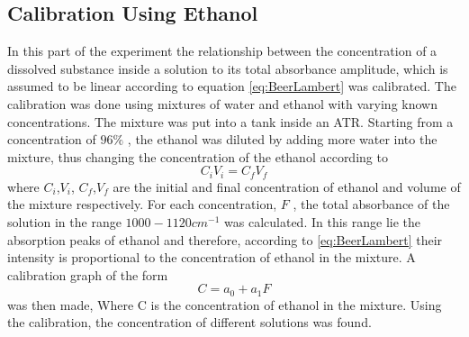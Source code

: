 \documentclass[reprint,amsmath,amssymb,aps, prl]{revtex4-2}
\begin{document}
\subsection{Calibration Using Ethanol} 
In this part of the experiment the relationship between the concentration of a dissolved substance inside a solution
to its total absorbance amplitude, which is assumed to be linear according to equation \ref{eq:BeerLambert} was calibrated. The calibration was done using mixtures of water and ethanol  with varying known concentrations. The mixture was put into a tank inside an ATR. Starting from a concentration of $96\%$ , the ethanol was diluted by adding more water into the mixture, thus changing the concentration of the ethanol according to 
\begin{equation} \label{eq:EthanolConcentrVolume}
C_{i}V_{i} = C_{f}V_{f}
\end{equation}
where $C_{i}$,$V_{i}$, $C_{f}$,$V_{f}$ are the initial and final concentration of ethanol and volume of the mixture respectively. 
For each concentration, $F$ , the total absorbance of the solution in the range $1000-1120 cm^{-1}$ was calculated. In this range lie the absorption peaks of ethanol \cite{NISTwebook} and therefore, according to \ref{eq:BeerLambert} their intensity is proportional to the concentration of ethanol in the mixture. A calibration graph of the form 
\begin{equation} \label{eq:EthanolLinFit}
    C=a_{0}+a_{1}F 
\end{equation} 
was then made, Where C is the concentration of ethanol in the mixture. Using the calibration, the concentration of different solutions was found. 
\end{document}
